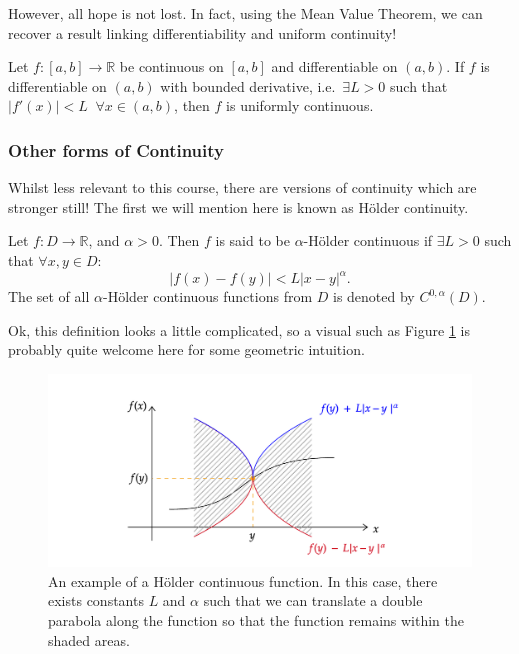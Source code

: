 \documentclass[
  10pt,
  a4paper]{article}
\theoremstyle{plain}
\theoremstyle{definition}
\theoremstyle{plain}
\theoremstyle{plain}
\theoremstyle{plain}
\theoremstyle{plain}
\theoremstyle{definition}
\theoremstyle{definition}
\theoremstyle{remark}
\theoremstyle{remark}
\let\BeginKnitrBlock\begin \let\EndKnitrBlock\end
\begin{document}
However, all hope is not lost. In fact, using the Mean Value Theorem, we can recover a result linking differentiability and uniform continuity!

\BeginKnitrBlock{proposition}
{\label{prp:prop3} }Let \(f:[a,b] \to \mathbb{R}\) be continuous on \([a,b]\) and differentiable on \((a,b).\) If \(f\) is differentiable on \((a,b)\) with bounded derivative, i.e.~\(\exists L > 0\) such that \(\lvert f'(x) \rvert < L \;\;\forall x \in (a,b)\), then \(f\) is uniformly continuous.
\EndKnitrBlock{proposition}

\hypertarget{other-forms-of-continuity}{%
\subsubsection{Other forms of Continuity}\label{other-forms-of-continuity}}

Whilst less relevant to this course, there are versions of continuity which are stronger still! The first we will mention here is known as Hölder continuity.

\BeginKnitrBlock{definition}[Hölder Continuity]
{\label{def:def5} }Let \(f:D \to \mathbb{R}\), and \(\alpha>0\). Then \(f\) is said to be \(\alpha\)-Hölder continuous if \(\exists L > 0\) such that \(\forall x,y \in D\): \[\lvert f(x) - f(y) \rvert < L \lvert x - y \rvert^{\alpha}.\] The set of all \(\alpha\)-Hölder continuous functions from \(D\) is denoted by \(C^{0,\alpha}\left(D\right).\)
\EndKnitrBlock{definition}

Ok, this definition looks a little complicated, so a visual such as Figure \ref{fig:Holder} is probably quite welcome here for some geometric intuition.

\begin{figure}

{\centering \includegraphics{Holder} 

}

\caption{An example of a Hölder continuous function. In this case, there exists constants $L$ and $\alpha$ such that we can translate a double parabola along the function so that the function remains within the shaded areas.}\label{fig:Holder}
\end{figure}
\end{document}
